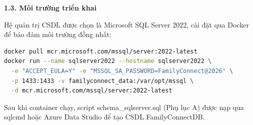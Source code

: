 {}
{\Large\bfseries 1.3. Môi trường triển khai}\par\vspace{0.7em}

Hệ quản trị CSDL được chọn là Microsoft SQL Server 2022, cài đặt qua Docker để bảo đảm môi trường đồng nhất:

\begin{lstlisting}[language=bash]
docker pull mcr.microsoft.com/mssql/server:2022-latest
docker run --name sqlserver2022 --hostname sqlserver2022 \
  -e "ACCEPT_EULA=Y" -e "MSSQL_SA_PASSWORD=FamilyConnect@2026" \
  -p 1433:1433 -v familyconnect_data:/var/opt/mssql \
  -d mcr.microsoft.com/mssql/server:2022-latest
\end{lstlisting}

Sau khi container chạy, script schema\_sqlserver.sql (Phụ lục A) được nạp qua sqlcmd hoặc Azure Data Studio để tạo CSDL FamilyConnectDB.